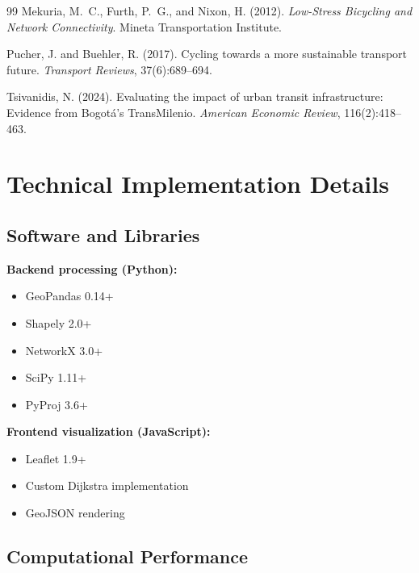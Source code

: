 \documentclass[12pt,a4paper]{article}
\begin{document}
\begin{thebibliography}{99}
Mekuria, M.~C., Furth, P.~G., and Nixon, H. (2012).
\newblock \textit{Low-Stress Bicycling and Network Connectivity}.
\newblock Mineta Transportation Institute.

Pucher, J. and Buehler, R. (2017).
\newblock Cycling towards a more sustainable transport future.
\newblock \textit{Transport Reviews}, 37(6):689--694.

Tsivanidis, N. (2024).
\newblock Evaluating the impact of urban transit infrastructure: Evidence from {B}ogot\'{a}'s {T}rans{M}ilenio.
\newblock \textit{American Economic Review}, 116(2):418--463.

\end{thebibliography}

\appendix

\section{Technical Implementation Details}
\label{app:technical}

\subsection{Software and Libraries}

\textbf{Backend processing (Python):}
\begin{itemize}
    \item GeoPandas 0.14+
    \item Shapely 2.0+
    \item NetworkX 3.0+
    \item SciPy 1.11+
    \item PyProj 3.6+
\end{itemize}

\textbf{Frontend visualization (JavaScript):}
\begin{itemize}
    \item Leaflet 1.9+
    \item Custom Dijkstra implementation
    \item GeoJSON rendering
\end{itemize}

\subsection{Computational Performance}
\end{document}
